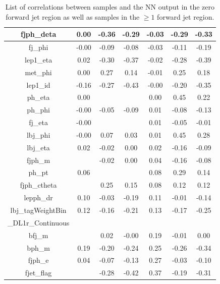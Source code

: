 \begin{table}[htbp]
\begin{tabular}{c|c c c|c c c}
        fjph\_deta                        &  0.00 &     -0.36 &  -0.29 & -0.03 &     -0.29 &  -0.33 \\ \hline
        fj\_phi                           & -0.00 &     -0.09 &  -0.08 & -0.03 &     -0.11 &  -0.19 \\ \hline
        lep1\_eta                         &  0.02 &     -0.30 &  -0.37 & -0.02 &     -0.28 &  -0.39 \\ \hline
        met\_phi                          &  0.00 &      0.27 &   0.14 & -0.01 &      0.25 &   0.18 \\ \hline
        lep1\_id                          & -0.16 &     -0.27 &  -0.43 & -0.00 &     -0.20 &  -0.35 \\ \hline
        ph\_eta                           &  0.00 &        &     &  0.00 &      0.45 &   0.22 \\ \hline
        ph\_phi                           & -0.00 &     -0.05 &  -0.09 &  0.01 &     -0.08 &  -0.13 \\ \hline
        fj\_eta                           & -0.00 &        &     &  0.01 &     -0.05 &  -0.01 \\ \hline
        lbj\_phi                          & -0.00 &      0.07 &   0.03 &  0.01 &      0.45 &   0.28 \\ \hline
        lbj\_eta                          &  0.02 &     -0.02 &   0.00 &  0.02 &     -0.16 &  -0.09 \\ \hline
        fjph\_m                           &    &     -0.02 &   0.00 &  0.04 &     -0.16 &  -0.08 \\ \hline
        ph\_pt                            &  0.06 &        &     &  0.08 &      0.29 &   0.14 \\ \hline
        fjph\_ctheta                      &    &      0.25 &   0.15 &  0.08 &      0.12 &   0.12 \\ \hline
        lepph\_dr                         &  0.10 &     -0.03 &  -0.19 &  0.11 &     -0.01 &  -0.14 \\ \hline
        lbj\_tagWeightBin &  0.12 &     -0.16 &  -0.21 &  0.13 &     -0.17 &  -0.25 \\ 
        \_DL1r\_Continuous &&&&&&\\ \hline
        bfj\_m                            &    &      0.02 &  -0.00 &  0.19 &     -0.01 &   0.00 \\ \hline
        bph\_m                            &  0.19 &     -0.20 &  -0.24 &  0.25 &     -0.26 &  -0.34 \\ \hline
        fjph\_e                           &  0.04 &     -0.07 &  -0.13 &  0.27 &     -0.03 &  -0.10 \\ \hline
        fjet\_flag                        &    &     -0.28 &  -0.42 &  0.37 &     -0.19 &  -0.31 \\ \hline
        \bottomrule
        \end{tabular}
    \caption{List of correlations between samples and the NN output in the zero forward jet region as well as samples in the $\geq 1$ forward jet region.}
    \label{tab:corrAll}
\end{table}
